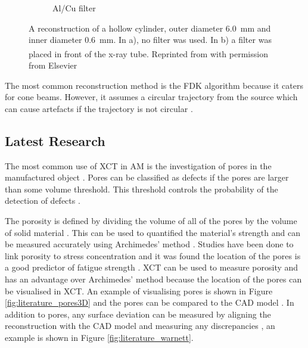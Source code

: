 \begin{figure}
\begin{subfigure}[b]{0.4\textwidth}
      \caption{Al/Cu filter}
    \end{subfigure}
  \caption{A reconstruction of a hollow cylinder, outer diameter \SI{6.0}{\milli\metre} and inner diameter \SI{0.6}{\milli\metre}. In a), no filter was used. In b) a filter was placed in front of the x-ray tube. Reprinted from \citep{kruth2011computed}\textsuperscript{\textcopyright} with permission from Elsevier}
  \label{fig:literature_hardening}
\end{figure}

The most common reconstruction method is the FDK \citep{feldkamp1984practical} algorithm because it caters for cone beams. However, it assumes a circular trajectory from the source which can cause artefacts if the trajectory is not circular \citep{sun2016applications}.

\subsection{Latest Research}

The most common use of XCT in AM is the investigation of pores in the manufactured object \citep{thompson2016x}. Pores can be classified as defects if the pores are larger than some volume threshold. This threshold controls the probability of the detection of defects \citep{gandossi2010probability, amrhein2014characterization}.

The porosity is defined by dividing the volume of all of the pores by the volume of solid material \citep{taud2005porosity}. This can be used to quantified the material's strength and can be measured accurately using Archimedes' method \citep{spierings2011comparison}. Studies have been done to link porosity to stress concentration \citep{leuders2015fatigue, siddique2015computed, carlton2016damage} and it was found the location of the pores is a good predictor of fatigue strength \citep{leuders2015fatigue}. XCT can be used to measure porosity and has an advantage over Archimedes' method because the location of the pores can be visualised in XCT. An example of visualising pores is shown in Figure \ref{fig:literature_pores3D} and the pores can be compared to the CAD model \citep{lee2015compliance, villarraga2015assessing, kim2016inspection}. In addition to pores, any surface deviation can be measured by aligning the reconstruction with the CAD model and measuring any discrepancies \citep{lee2015compliance, villarraga2015assessing, kim2016inspection}, an example is shown in Figure \ref{fig:literature_warnett}.

